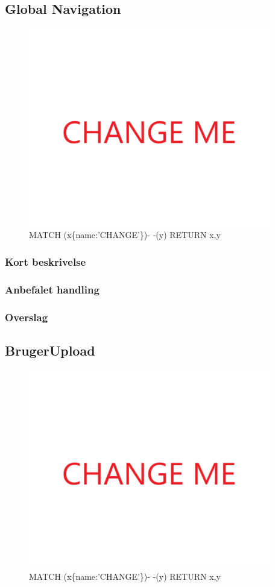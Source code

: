 \documentclass{article}
\begin{document}
\subsection{Global Navigation}
\begin{figure}[h]
\includegraphics[width=300pt]{CHANGE.PNG}
\caption{MATCH (x\{name:'CHANGE'\})- -(y) RETURN x,y}
\end{figure}
\subsubsection{Kort beskrivelse}
\subsubsection{Anbefalet handling}
\subsubsection{Overslag}


\subsection{BrugerUpload}
\begin{figure}[h]
\includegraphics[width=300pt]{CHANGE.PNG}
\caption{MATCH (x\{name:'CHANGE'\})- -(y) RETURN x,y}
\end{figure}
\end{document}
